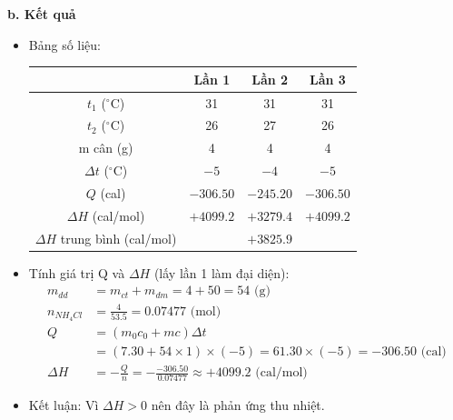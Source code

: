 \textbf{b. Kết quả}
\begin{itemize}
    \item Bảng số liệu:
    \begin{table}[H]
        \centering
        \begin{tabular}{|c|c|c|c|}
            \hline
            & \textbf{Lần 1} & \textbf{Lần 2} & \textbf{Lần 3} \\
            \hline
            $t_1$ ($^\circ$C) & 31 & 31 & 31 \\
            \hline
            $t_2$ ($^\circ$C) & 26 & 27 & 26 \\
            \hline
            m cân (g) & 4 & 4 & 4 \\
            \hline
            $\Delta t$ ($^\circ$C) & $-5$ & $-4$ & $-5$ \\
            \hline
            $Q$ (cal) & $-306.50$ & $-245.20$ & $-306.50$ \\
            \hline
            $\Delta H$ (cal/mol) & $+4099.2$ & $+3279.4$ & $+4099.2$ \\
            \hline
            $\Delta H$ trung bình (cal/mol) & \multicolumn{3}{c|}{$+3825.9$} \\
            \hline
        \end{tabular}
    \end{table}
    \item Tính giá trị Q và $\Delta H$ (lấy lần 1 làm đại diện):
    \begin{align*}
        m_{dd} &= m_{ct} + m_{dm} = 4 + 50 = 54 \text{ (g)} \\
        n_{NH_4Cl} &= \frac{4}{53.5} = 0.07477 \text{ (mol)} \\
        Q &= (m_0c_0 + mc)\Delta t \\
          &= (7.30 + 54 \times 1) \times (-5) = 61.30 \times (-5) = -306.50 \text{ (cal)} \\
        \Delta H &= -\frac{Q}{n} = -\frac{-306.50}{0.07477} \approx +4099.2 \text{ (cal/mol)}
    \end{align*}
    \item Kết luận: Vì $\Delta H > 0$ nên đây là phản ứng thu nhiệt.
\end{itemize}

